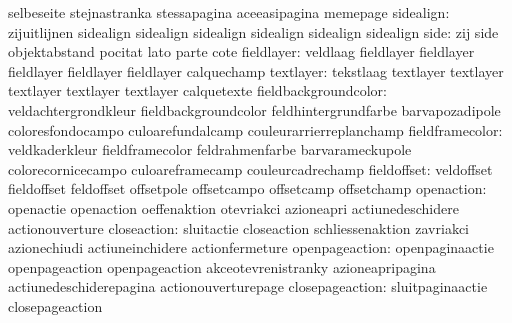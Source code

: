                            selbeseite                stejnastranka
                           stessapagina              aceeasipagina
                           memepage
                sidealign: zijuitlijnen              sidealign
                           sidealign                 sidealign
                           sidealign                 sidealign
                           sidealign
                     side: zij                       side
                           objektabstand             pocitat
                           lato                      parte
                           cote
               fieldlayer: veldlaag                  fieldlayer
                           fieldlayer                fieldlayer
                           fieldlayer                fieldlayer
                           calquechamp
                textlayer: tekstlaag                 textlayer
                           textlayer                 textlayer
                           textlayer                 textlayer
                           calquetexte
     fieldbackgroundcolor: veldachtergrondkleur      fieldbackgroundcolor
                           feldhintergrundfarbe      barvapozadipole
                           coloresfondocampo         culoarefundalcamp
                           couleurarrierreplanchamp
          fieldframecolor: veldkaderkleur            fieldframecolor
                           feldrahmenfarbe           barvarameckupole
                           colorecornicecampo        culoareframecamp
                           couleurcadrechamp
              fieldoffset: veldoffset                fieldoffset
                           feldoffset                offsetpole
                           offsetcampo               offsetcamp
                           offsetchamp
               openaction: openactie                 openaction
                           oeffenaktion              otevriakci
                           azioneapri                actiunedeschidere
                           actionouverture
              closeaction: sluitactie                closeaction
                           schliessenaktion          zavriakci
                           azionechiudi              actiuneinchidere
                           actionfermeture
           openpageaction: openpaginaactie           openpageaction
                           openpageaction            akceotevrenistranky
                           azioneapripagina          actiunedeschiderepagina
                           actionouverturepage
          closepageaction: sluitpaginaactie          closepageaction

